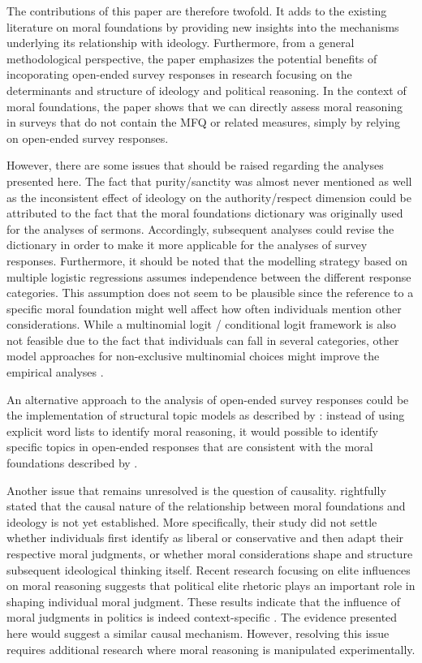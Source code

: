 \documentclass[12pt]{article}
\begin{document}
The contributions of this paper are therefore twofold. It adds to the existing literature on moral foundations by providing new insights into the mechanisms underlying its relationship with ideology. Furthermore, from a general methodological perspective, the paper emphasizes the potential benefits of incoporating open-ended survey responses in research focusing on the determinants and structure of ideology and political reasoning. In the context of moral foundations, the paper shows that we can directly assess moral reasoning in surveys that do not contain the MFQ or related measures, simply by relying on open-ended survey responses.

However, there are some issues that should be raised regarding the analyses presented here. The fact that purity/sanctity was almost never mentioned as well as the inconsistent effect of ideology on the authority/respect dimension could be attributed to the fact that the moral foundations dictionary was originally used for the analyses of sermons. Accordingly, subsequent analyses could revise the dictionary in order to make it more applicable for the analyses of survey responses. Furthermore, it should be noted that the modelling strategy based on multiple logistic regressions assumes independence between the different response categories. This assumption does not seem to be plausible since the reference to a specific moral foundation might well affect how often individuals mention other considerations. While a multinomial logit / conditional logit framework is also not feasible due to the fact that individuals can fall in several categories, other model approaches for non-exclusive multinomial choices might improve the empirical analyses \citep[see for example][]{gilbert2007models}.

An alternative approach to the analysis of open-ended survey responses could be the implementation of structural topic models as described by \citet{roberts2014structural}: instead of using explicit word lists to identify moral reasoning, it would possible to identify specific topics in open-ended responses that are consistent with the moral foundations described by \citet{haidt2008moral} \citep[see also][]{lin2008joint}.

Another issue that remains unresolved is the question of causality. \citet{graham2009liberals} rightfully stated that the causal nature of the relationship between moral foundations and ideology is not yet established. More specifically, their study did not settle whether individuals first identify as liberal or conservative and then adapt their respective moral judgments, or whether moral considerations shape and structure subsequent ideological thinking itself. Recent research focusing on elite influences on moral reasoning suggests that political elite rhetoric plays an important role in shaping individual moral judgment. These results indicate that the influence of moral judgments in politics is indeed context-specific \citep[see for example][]{clifford2013words,clifford2015concerns}. The evidence presented here would suggest a similar causal mechanism. However, resolving this issue requires additional research where moral reasoning is manipulated experimentally.
\end{document}
